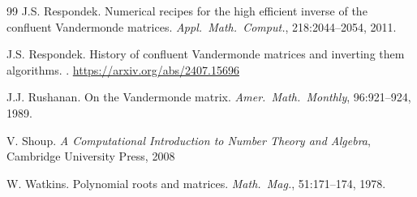 \documentclass{article}
\theoremstyle{definition}
\begin{document}
\begin{thebibliography}{99}
J.S. Respondek. 
\newblock Numerical recipes for the high efficient inverse of the confluent Vandermonde matrices.
\newblock \emph{Appl.\ Math.\ Comput.}, 218:2044--2054, 2011. 

J.S. Respondek.
\newblock History of confluent Vandermonde matrices and inverting them algorithms.
. \url{https://arxiv.org/abs/2407.15696}

J.J. Rushanan.
\newblock On the Vandermonde matrix. 
\newblock \emph{Amer.\ Math.\ Monthly}, 96:921--924, 1989.

V. Shoup.
\newblock \emph{A Computational Introduction to Number Theory and Algebra},  Cambridge University Press, 2008

W. Watkins.
\newblock Polynomial roots and matrices.
\newblock \emph{Math.\ Mag.}, 51:171--174, 1978.

\end{thebibliography}
\end{document}
